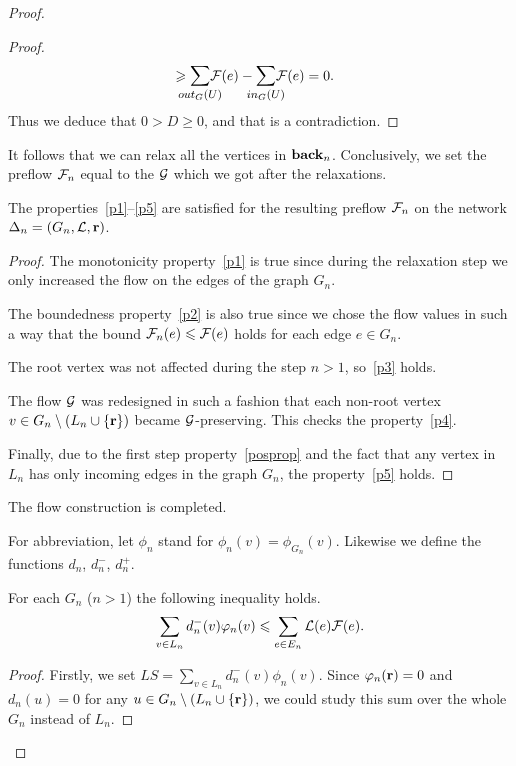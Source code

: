 \documentclass[12pt]{amsart}
\begin{document}
\begin{proof}
\begin{proof}
\[\begin{split}
            &\geq \mathlarger{\smashoperator{\sum_{\eout_G(U)}}} \flowpos(e) - \mathlarger{\smashoperator{\sum_{\ein_{G}(U)}}} \flowpos(e) = 0.
          \end{split}
        \]
          Thus we deduce that $0 > D \geq 0$, and that is a contradiction.
        \end{proof}
        It follows that we can relax all the vertices in $\eback_n$.
        Conclusively, we set the preflow $\flowposn{n}$ equal to the $\cal{G}$ which we got after the relaxations.
        \begin{prop}
          The properties~\ref{p1}--\ref{p5} are satisfied for the resulting preflow $\flowposn{n}$ on the network $\net_n = (G_n, \len, \root)$.
        \end{prop}
        \begin{proof}
          The monotonicity property~\ref{p1} is true since during the relaxation step we
            only increased the flow on the edges of the graph $G_n$.

          The boundedness property~\ref{p2} is also true since we chose the flow values in such a way
            that the bound $\flowposn{n}(e) \leq \flowpos(e)$ holds for each edge $e\in G_n$.

          The root vertex was not affected during the step $n > 1$, so~\ref{p3} holds.

          The flow $\cal{G}$ was redesigned in such a fashion that each non-root vertex $v \in G_{n} \setminus 
            \left(L_n \cup \{\root\}\right)$ became $\cal{G}$-preserving.
          This checks the property~\ref{p4}.

          Finally, due to the first step property~\ref{posprop} and the fact that
          any vertex in $L_n$ has only incoming edges in the graph $G_n$, the property~\ref{p5} holds.
        \end{proof}
        The flow construction is completed.
        
        For abbreviation, let $\phi_n$ stand for $\phi_n(v) = \phi_{G_n}(v)$.
        Likewise we define the functions $d_n$, $d^{-}_n$, $d^{+}_n$.
        \begin{lemma}
          For each $G_n$ ($n > 1$) the following inequality holds.
          \begin{equation}
            \label{main-ineq}
            \sum_{v\in L_n}d_{n}^{-}(v) \phi_n(v) \leq \sum_{e \in E_n} \len(e) \flowpos(e).
          \end{equation}
        \end{lemma}
        \begin{proof}
          Firstly, we set $LS = \sum_{v \in L_n} d_n^{-}(v) \phi_n(v).$
          Since $\phi_n(\root) = 0$ and $d_n(u) = 0$ for any $u \in G_{n} \setminus \left(L_n \cup \{\root\}\right)$,
            we could study this sum over the whole $G_n$ instead of $L_n$.


\end{proof}
\end{proof}
\end{document}
